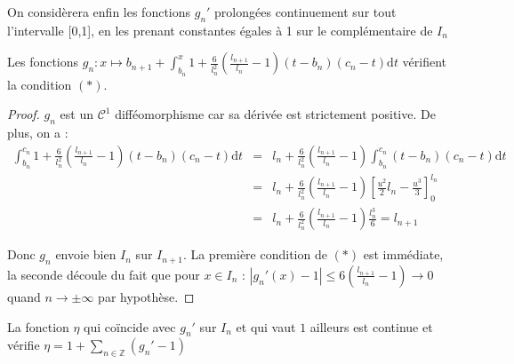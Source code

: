 \documentclass[11pt,a4paper]{article}
\begin{document}
On considèrera enfin les fonctions $g_n'$ prolongées continuement sur tout l'intervalle [0,1], en les prenant constantes égales à 1 sur le complémentaire de $I_n$

\begin{lemma}
Les fonctions $\displaystyle g_n : x \mapsto b_{n+1} + \int_{b_n}^x 1 + \frac{6}{l_n^2}(\frac{l_{n+1}}{l_n} -1)(t-b_n)(c_n-t)\mathrm{d}t$ vérifient la condition $(*)$.
\end{lemma}

\begin{proof}
$g_n$ est un $\mathcal{C}^1$ difféomorphisme car sa dérivée est strictement positive. De plus, on a :
\begin{eqnarray*}
\int_{b_n}^{c_n} 1 + \frac{6}{l_n^2}(\frac{l_{n+1}}{l_n} -1)(t-b_n)(c_n-t)\mathrm{d}t &=& l_n +  \frac{6}{l_n^2}(\frac{l_{n+1}}{l_n} -1)\int_{b_n}^{c_n} (t-b_n)(c_n-t)\mathrm{d}t \\
&=& l_n +  \frac{6}{l_n^2}(\frac{l_{n+1}}{l_n} -1) \left [\frac{u^2}{2}l_n - \frac{u^3}{3}\right ]^{l_n}_0 \\
&=& l_n +  \frac{6}{l_n^2}(\frac{l_{n+1}}{l_n} -1) \frac{l_n^3}{6} = l_{n+1}
\end{eqnarray*}

Donc $g_n$ envoie bien $I_n$ sur $I_{n+1}$. La première condition de $(*)$ est immédiate, la seconde découle du fait que pour $x\in I_n$ : $ \displaystyle |g_n'(x) -1| \leq 6(\frac{l_{n+1}}{l_n} -1) \to 0 $ quand $n\to \pm \infty$ par hypothèse. 
\end{proof}

\begin{lemma}
La fonction $\eta$ qui coïncide avec $g_n'$ sur $I_n$ et qui vaut $1$ ailleurs est continue et vérifie $\displaystyle \eta =  1 + \sum_{n \in \mathbb{Z}} (g_n'-1)$
\end{lemma}
\end{document}

